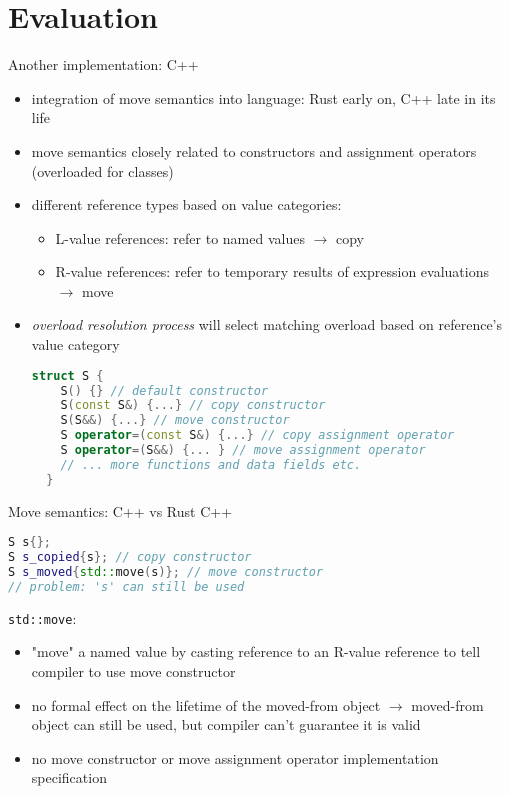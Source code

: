 \documentclass{beamer}
\begin{document}
\section{Evaluation}

\begin{frame}[fragile]{Another implementation: C++}
\begin{itemize}
  \item integration of move semantics into language: Rust early on, C++ late in its life
  \item move semantics closely related to constructors and assignment operators (overloaded for classes)
  \item different reference types based on value categories:
  \begin{itemize}
    \item L-value references: refer to named values $\rightarrow$ copy
    \item R-value references: refer to temporary results of expression evaluations $\rightarrow$ move
  \end{itemize}
  \item \emph{overload resolution process} will select matching overload based on reference's value category
  \begin{lstlisting}[language=C++]
  struct S {
    S() {} // default constructor
    S(const S&) {...} // copy constructor
    S(S&&) {...} // move constructor
    S operator=(const S&) {...} // copy assignment operator
    S operator=(S&&) {... } // move assignment operator
    // ... more functions and data fields etc.
  }
  \end{lstlisting}
\end{itemize}
\end{frame}


\begin{frame}[fragile]{Move semantics: C++ vs Rust}
C++
\begin{lstlisting}[language=C++]
S s{};
S s_copied{s}; // copy constructor
S s_moved{std::move(s)}; // move constructor
// problem: 's' can still be used
\end{lstlisting}

\verb|std::move|:
\begin{itemize}
  \item "move" a named value by casting reference to an R-value reference to tell compiler to use move constructor
  \item no formal effect on the lifetime of the moved-from object $\rightarrow$ moved-from object can still be used, but compiler can't guarantee it is valid
  \item no move constructor or move assignment operator implementation specification
\end{itemize}
\end{frame}
\end{document}
